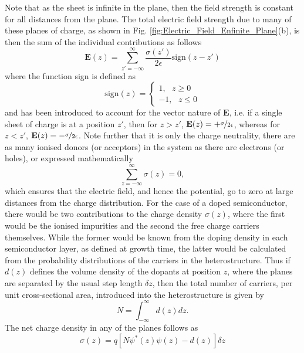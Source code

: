 Note that as the sheet is infinite in the plane, then the field strength
is constant for all distances from the plane. The total electric field
strength due to many of these planes of charge, as shown in Fig. \ref{fig:Electric_Field_Enfinite_Plane}(b),
is then the sum of the individual contributions as follows\begin{equation}
\mathbf{E}(z)=\sum_{z'=-\infty}^{\infty}\frac{\sigma(z')}{2\epsilon}\textrm{sign}\left(z-z'\right)\label{eq:Electrical_Field_Poisson}\end{equation}
where the function sign is defined as \begin{equation}
\textrm{sign}\left(z\right)=\left\{ \begin{array}{c}
1,\,\,\,\, z\geq0\\
-1,\,\,\,\, z\leq0\end{array}\right.\end{equation}
and has been introduced to account for the vector nature of $\mathbf{E}$,
i.e. if a single sheet of charge is at a position $z'$, then for
$z>z'$, $\mathbf{E}(z)=+\nicefrac{\sigma}{2\epsilon}$, whereas for
$z<z'$, $\mathbf{E}(z)=-\nicefrac{\sigma}{2\epsilon}$. Note further
that it is only the charge neutrality, there are as many ionised donors
(or acceptors) in the system as there are electrons (or holes), or
expressed mathematically\begin{equation}
\sum_{z=-\infty}^{\infty}\sigma(z)=0,\end{equation}
which ensures that the electric field, and hence the potential, go
to zero at large distances from the charge distribution. For the case
of a doped semiconductor, there would be two contributions to the
charge density $\sigma(z)$, where the first would be the ionised
impurities and the second the free charge carriers themselves. While
the former would be known from the doping density in each semiconductor
layer, as defined at growth time, the latter would be calculated from
the probability distributions of the carriers in the heterostructure.
Thus if $d(z)$ defines the volume density of the dopants at position
$z$, where the planes are separated by the usual step length $\delta z$,
then the total number of carriers, per unit cross-sectional area,
introduced into the heterostructure is given by\begin{equation}
N=\int_{-\infty}^{\infty}d(z)dz.\end{equation}
The net charge density in any of the planes follows as\begin{equation}
\sigma(z)=q\left[N\psi^{*}(z)\psi(z)-d(z)\right]\delta z\end{equation}
